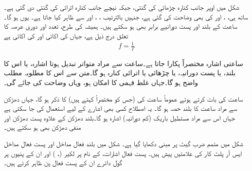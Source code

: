 شکل  میں اوپر جانب کنارہ چڑھائی کی گنتی، جبکہ نیچے جانب کنارہ اترائی کی گنتی دی گئی ہے۔ساتھ ہی، ،  اور کی بھی وضاحت کی گئی ہے، جنہیں بالترتیب ، ، اور  سے ظاہر کیا جاتا ہے۔
یوں  ہو گا۔ ساعت کے بلند اور پست دورانیے برابر بھی ہو سکتے ہیں۔ ہمیشہ کی طرح، تعدد  اور دوری عرصہ  کا تعلق درج ذیل ہے، جہاں  کی اکائی  اور  کی اکائی  ہے
\begin{align*}
f=\frac{1}{T}
\end{align*}

ساعتی اشارہ مختصراً  پکارا جاتا ہے۔ساعت سے مراد متواتر تبدیل ہوتا اشارہ، یا اس کا بلند، یا پست دورانیہ، یا چڑھائی یا اترائی کنارہ ہو گا۔متن سے اس کا مطلوبہ مطلب واضح ہو گا۔جہاں غلط فہمی کا امکان ہو، وہاں وضاحت کی جائے گی۔

ساعت کی بات کرتے ہوئے عموماً ساعت کی  (جس کو مختصراً کہتے ہیں) کا ذکر ہو گا، جہاں دھڑکن سے مراد ساعت کا بلند حصہ ہو گا۔ یہ اصطلاح کسی بھی اشارے کے لیے استعمال کی جا سکتی ہے جہاں اس سے مراد مستطیل باریک (کم دورانیہ) اشارہ ہو گا۔بلند دھڑکن کے علاوہ پست دھڑکن اور منفی دھڑکن بھی ہو سکتے ہیں۔ 

شکل  میں متمم ضرب گیٹ پر مبنی  دکھایا گیا ہے۔ شکل  میں بلند فعال مداخل اور پست فعال مداخل ایس آر پلٹ کار کی علامتیں پیش ہیں۔ پست فعال اشارات، کے نام پر لکیر (، ) اور ان کے پنیوں پر گول دائرے ان کے پست فعال پن ظاہر کرتے ہیں۔


